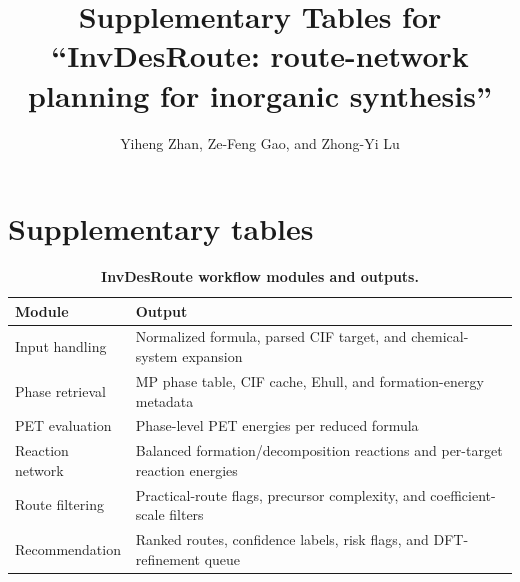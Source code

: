 \documentclass[11pt, letterpaper]{article}
\begin{document}
\title{Supplementary Tables for ``InvDesRoute: route-network planning for inorganic synthesis''}
\author{Yiheng Zhan, Ze-Feng Gao, and Zhong-Yi Lu}
\date{}
\maketitle

\section*{Supplementary tables}
\begin{table}[p]
\centering
\tiny
\caption{\textbf{InvDesRoute workflow modules and outputs.}}
\begin{tabular}{p{}p{}}
\toprule
\textbf{Module} & \textbf{Output} \\
\midrule
Input handling & Normalized formula, parsed CIF target, and chemical-system expansion \\
Phase retrieval & MP phase table, CIF cache, Ehull, and formation-energy metadata \\
PET evaluation & Phase-level PET energies per reduced formula \\
Reaction network & Balanced formation/decomposition reactions and per-target reaction energies \\
Route filtering & Practical-route flags, precursor complexity, and coefficient-scale filters \\
Recommendation & Ranked routes, confidence labels, risk flags, and DFT-refinement queue \\
\bottomrule
\end{tabular}
\label{supp-tab:workflow_modules}
\end{table}
\end{document}
